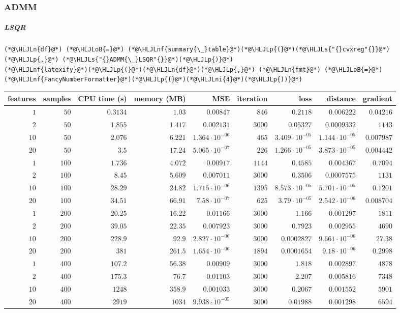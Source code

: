 \documentclass[12pt,a4paper]{article}
\newcommand{\HLJLn}[1]{#1}
\newcommand{\HLJLnf}[1]{\textcolor[RGB]{66,102,213}{#1}}
\newcommand{\HLJLs}[1]{\textcolor[RGB]{201,61,57}{#1}}
\newcommand{\HLJLni}[1]{\textcolor[RGB]{59,151,46}{#1}}
\newcommand{\HLJLoB}[1]{\textcolor[RGB]{102,102,102}{\textbf{#1}}}
\newcommand{\HLJLp}[1]{#1}
\begin{document}
\subsubsection{ADMM}
\subparagraph{LSQR}

\begin{lstlisting}
(*@\HLJLn{df}@*) (*@\HLJLoB{=}@*) (*@\HLJLnf{summary{\_}table}@*)(*@\HLJLp{(}@*)(*@\HLJLs{"{}cvxreg"{}}@*)(*@\HLJLp{,}@*) (*@\HLJLs{"{}ADMM{\_}LSQR"{}}@*)(*@\HLJLp{)}@*)
(*@\HLJLnf{latexify}@*)(*@\HLJLp{(}@*)(*@\HLJLn{df}@*)(*@\HLJLp{,}@*) (*@\HLJLn{fmt}@*) (*@\HLJLoB{=}@*) (*@\HLJLnf{FancyNumberFormatter}@*)(*@\HLJLp{(}@*)(*@\HLJLni{4}@*)(*@\HLJLp{))}@*)
\end{lstlisting}


\begin{tabular}
{r | r | r | r | r | r | r | r | r}
features & samples & CPU time (s) & memory (MB) & MSE & iteration & loss & distance & gradient \\
\hline
$1$ & $50$ & $0.3134$ & $1.03$ & $0.00847$ & $846$ & $0.2118$ & $0.006222$ & $0.04216$ \\
$2$ & $50$ & $1.855$ & $1.417$ & $0.002131$ & $3000$ & $0.05327$ & $0.0009332$ & $1143$ \\
$10$ & $50$ & $2.076$ & $6.221$ & $1.364 \cdot 10^{-06}$ & $465$ & $3.409 \cdot 10^{-05}$ & $1.144 \cdot 10^{-05}$ & $0.007987$ \\
$20$ & $50$ & $3.5$ & $17.24$ & $5.065 \cdot 10^{-07}$ & $226$ & $1.266 \cdot 10^{-05}$ & $3.873 \cdot 10^{-05}$ & $0.004442$ \\
$1$ & $100$ & $1.736$ & $4.072$ & $0.00917$ & $1144$ & $0.4585$ & $0.004367$ & $0.7094$ \\
$2$ & $100$ & $8.45$ & $5.609$ & $0.007011$ & $3000$ & $0.3506$ & $0.0007575$ & $1131$ \\
$10$ & $100$ & $28.29$ & $24.82$ & $1.715 \cdot 10^{-06}$ & $1395$ & $8.573 \cdot 10^{-05}$ & $5.701 \cdot 10^{-05}$ & $0.1201$ \\
$20$ & $100$ & $34.51$ & $66.91$ & $7.58 \cdot 10^{-07}$ & $625$ & $3.79 \cdot 10^{-05}$ & $2.542 \cdot 10^{-06}$ & $0.008704$ \\
$1$ & $200$ & $20.25$ & $16.22$ & $0.01166$ & $3000$ & $1.166$ & $0.001297$ & $1811$ \\
$2$ & $200$ & $39.05$ & $22.35$ & $0.007923$ & $3000$ & $0.7923$ & $0.002955$ & $4690$ \\
$10$ & $200$ & $228.9$ & $92.9$ & $2.827 \cdot 10^{-06}$ & $3000$ & $0.0002827$ & $9.661 \cdot 10^{-06}$ & $27.38$ \\
$20$ & $200$ & $381$ & $261.5$ & $1.654 \cdot 10^{-06}$ & $1894$ & $0.0001654$ & $9.18 \cdot 10^{-06}$ & $0.2998$ \\
$1$ & $400$ & $107.2$ & $56.38$ & $0.00909$ & $3000$ & $1.818$ & $0.002897$ & $4878$ \\
$2$ & $400$ & $175.3$ & $76.7$ & $0.01103$ & $3000$ & $2.207$ & $0.005816$ & $7348$ \\
$10$ & $400$ & $1248$ & $358.9$ & $0.001033$ & $3000$ & $0.2067$ & $0.001552$ & $5901$ \\
$20$ & $400$ & $2919$ & $1034$ & $9.938 \cdot 10^{-05}$ & $3000$ & $0.01988$ & $0.001298$ & $6594$ \\
\end{tabular}
\end{document}
